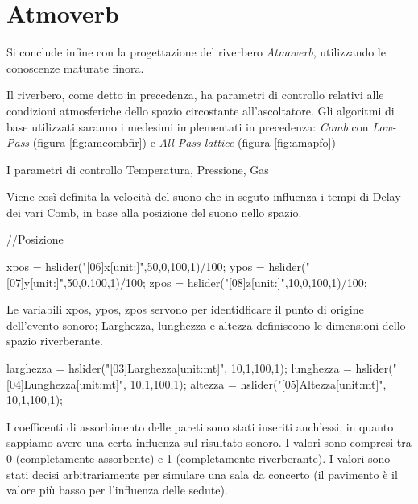 \section{Atmoverb}

Si conclude infine con la progettazione del riverbero \emph{Atmoverb},
utilizzando le conoscenze maturate finora.

Il riverbero, come detto in precedenza, ha parametri di controllo relativi alle
condizioni atmosferiche dello spazio circostante all'ascoltatore. %
Gli algoritmi di base utilizzati saranno i medesimi implementati in precedenza:
\emph{Comb} con \emph{Low-Pass} (figura \ref{fig:amcombfir}) e
\emph{All-Pass lattice} (figura \ref{fig:amapfo})

I parametri di controllo Temperatura, Pressione, Gas





Viene così definita la velocità del suono che in seguto influenza i tempi di
Delay dei vari Comb, in base alla posizione del suono nello spazio.

\begin{code}
//Posizione

xpos = hslider("[06]x[unit:]",50,0,100,1)/100;
ypos = hslider("[07]y[unit:]",50,0,100,1)/100;
zpos = hslider("[08]z[unit:]",10,0,100,1)/100;
\end{code}

Le variabili xpos, ypos, zpos servono per identidficare il punto di origine dell'evento sonoro;
Larghezza, lunghezza e altezza definiscono le dimensioni dello spazio riverberante.

\begin{code}
larghezza = hslider("[03]Larghezza[unit:mt]", 10,1,100,1);
lunghezza = hslider("[04]Lunghezza[unit:mt]", 10,1,100,1);
altezza = hslider("[05]Altezza[unit:mt]", 10,1,100,1);
\end{code}


I coefficenti di assorbimento delle pareti sono stati inseriti anch'essi, in quanto sappiamo
avere una certa influenza sul risultato sonoro. I valori sono compresi tra 0
(completamente assorbente) e 1 (completamente riverberante). I valori sono stati decisi
arbitrariamente per simulare una sala da concerto (il pavimento è il valore più basso per
l'influenza delle sedute).

